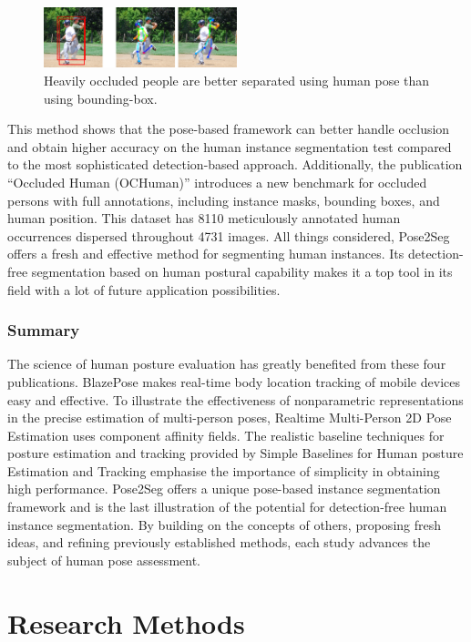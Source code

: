 \documentclass[runningheads]{llncs}
\begin{document}
        \begin{figure}[htbp]
            \centering
            \includegraphics[width=0.5\textwidth]{figures/Pose2Seg.png}
            \caption{Heavily occluded people are better separated using human pose than using bounding-box.}
        \end{figure}

        This method shows that the pose-based framework can better handle occlusion and obtain higher accuracy on the human instance segmentation test compared to the most sophisticated detection-based approach. Additionally, the publication ``Occluded Human (OCHuman)'' introduces a new benchmark for occluded persons with full annotations, including instance masks, bounding boxes, and human position. This dataset has 8110 meticulously annotated human occurrences dispersed throughout 4731 images. All things considered, Pose2Seg offers a fresh and effective method for segmenting human instances. Its detection-free segmentation based on human postural capability makes it a top tool in its field with a lot of future application possibilities. 
    \subsubsection{Summary}
        The science of human posture evaluation has greatly benefited from these four publications. BlazePose makes real-time body location tracking of mobile devices easy and effective. To illustrate the effectiveness of nonparametric representations in the precise estimation of multi-person poses, Realtime Multi-Person 2D Pose Estimation uses component affinity fields. The realistic baseline techniques for posture estimation and tracking provided by Simple Baselines for Human posture Estimation and Tracking emphasise the importance of simplicity in obtaining high performance. Pose2Seg offers a unique pose-based instance segmentation framework and is the last illustration of the potential for detection-free human instance segmentation. By building on the concepts of others, proposing fresh ideas, and refining previously established methods, each study advances the subject of human pose assessment.



\section{Research Methods} %
\end{document}
